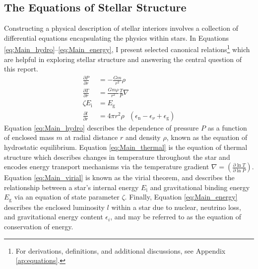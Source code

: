\documentclass[12pt]{article}
\newcommand{\pderiv}[2]{\frac{\partial #1}{\partial #2}}
\newcommand{\bigparenthesis}[1]{\left(#1\right)}
\begin{document}
\subsection{The Equations of Stellar Structure}
Constructing a physical description of stellar interiors involves a collection of differential equations encapsulating the physics within stars. In Equations \ref{eq:Main_hydro}--\ref{eq:Main_energy}, I present selected canonical relations\footnote{For derivations, definitions, and additional discussions, see Appendix \ref{ap:equations}.} which are helpful in exploring stellar structure and answering the central question of this report.%
%
\begin{align}
    \pderiv{P}{r} &= -\frac{Gm}{r^2}\rho \label{eq:Main_hydro} \\
    \pderiv{T}{r} &= \frac{Gm\rho}{r^2}\frac{T}{P} \nabla \label{eq:Main_thermal} \\
    \zeta E_\mathrm{i} &= E_\mathrm{g} \label{eq:Main_virial} \\
    \pderiv{l}{r} &= 4\pi r^2 \rho \text{ }(\epsilon_\mathrm{n} - \epsilon_\nu + \epsilon_\mathrm{g}) \label{eq:Main_energy} 
\end{align} %
%
Equation \ref{eq:Main_hydro} describes the dependence of pressure $P$ as a function of enclosed mass $m$ at radial distance $r$ and density $\rho$, known as the equation of hydrostatic equilibrium. Equation \ref{eq:Main_thermal} is the equation of thermal structure which describes changes in temperature throughout the star and encodes energy transport mechanisms via the temperature gradient $\nabla = \bigparenthesis{\pderiv{\ln T}{\ln P}}$. Equation \ref{eq:Main_virial} is known as the virial theorem, and describes the relationship between a star's internal energy $E_\mathrm{i}$ and gravitational binding energy $E_\mathrm{g}$ via an equation of state parameter $\zeta$. Finally, Equation \ref{eq:Main_energy} describes the enclosed luminosity $l$ within a star due to nuclear, neutrino loss, and gravitational energy content $\epsilon_i$, and may be referred to as the equation of conservation of energy.
\end{document}
